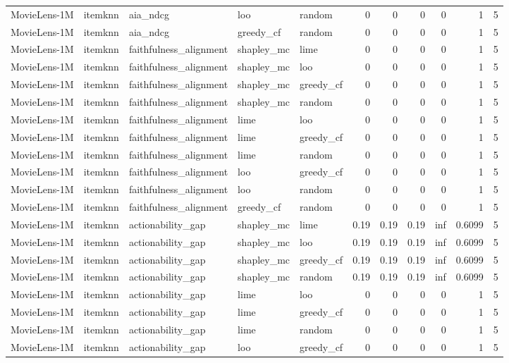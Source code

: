 \begin{table}[t]
{\begin{tabular}{lllllrrrrrr}
MovieLens-1M & itemknn & aia\_ndcg & loo & random & 0 & 0 & 0 & 0 & 1 & 5 \\
MovieLens-1M & itemknn & aia\_ndcg & greedy\_cf & random & 0 & 0 & 0 & 0 & 1 & 5 \\
MovieLens-1M & itemknn & faithfulness\_alignment & shapley\_mc & lime & 0 & 0 & 0 & 0 & 1 & 5 \\
MovieLens-1M & itemknn & faithfulness\_alignment & shapley\_mc & loo & 0 & 0 & 0 & 0 & 1 & 5 \\
MovieLens-1M & itemknn & faithfulness\_alignment & shapley\_mc & greedy\_cf & 0 & 0 & 0 & 0 & 1 & 5 \\
MovieLens-1M & itemknn & faithfulness\_alignment & shapley\_mc & random & 0 & 0 & 0 & 0 & 1 & 5 \\
MovieLens-1M & itemknn & faithfulness\_alignment & lime & loo & 0 & 0 & 0 & 0 & 1 & 5 \\
MovieLens-1M & itemknn & faithfulness\_alignment & lime & greedy\_cf & 0 & 0 & 0 & 0 & 1 & 5 \\
MovieLens-1M & itemknn & faithfulness\_alignment & lime & random & 0 & 0 & 0 & 0 & 1 & 5 \\
MovieLens-1M & itemknn & faithfulness\_alignment & loo & greedy\_cf & 0 & 0 & 0 & 0 & 1 & 5 \\
MovieLens-1M & itemknn & faithfulness\_alignment & loo & random & 0 & 0 & 0 & 0 & 1 & 5 \\
MovieLens-1M & itemknn & faithfulness\_alignment & greedy\_cf & random & 0 & 0 & 0 & 0 & 1 & 5 \\
MovieLens-1M & itemknn & actionability\_gap & shapley\_mc & lime & 0.19 & 0.19 & 0.19 & inf & 0.6099 & 5 \\
MovieLens-1M & itemknn & actionability\_gap & shapley\_mc & loo & 0.19 & 0.19 & 0.19 & inf & 0.6099 & 5 \\
MovieLens-1M & itemknn & actionability\_gap & shapley\_mc & greedy\_cf & 0.19 & 0.19 & 0.19 & inf & 0.6099 & 5 \\
MovieLens-1M & itemknn & actionability\_gap & shapley\_mc & random & 0.19 & 0.19 & 0.19 & inf & 0.6099 & 5 \\
MovieLens-1M & itemknn & actionability\_gap & lime & loo & 0 & 0 & 0 & 0 & 1 & 5 \\
MovieLens-1M & itemknn & actionability\_gap & lime & greedy\_cf & 0 & 0 & 0 & 0 & 1 & 5 \\
MovieLens-1M & itemknn & actionability\_gap & lime & random & 0 & 0 & 0 & 0 & 1 & 5 \\
MovieLens-1M & itemknn & actionability\_gap & loo & greedy\_cf & 0 & 0 & 0 & 0 & 1 & 5 \\

\end{tabular}}
\end{table}
